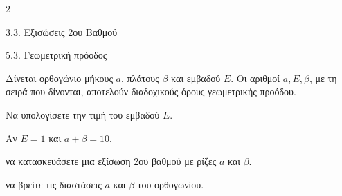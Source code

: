 \begin{ylh}{2}
    \item 3.3. Εξισώσεις 2ου Βαθμού
    \item 5.3. Γεωμετρική πρόοδος
\end{ylh}
Δίνεται ορθογώνιο μήκους $a$, πλάτους $\beta$ και εμβαδού $E$. Οι αριθμοί $a, E, \beta$, με τη σειρά που δίνονται, αποτελούν διαδοχικούς όρους γεωμετρικής προόδου.

\begin{alist}
\item Να υπολογίσετε την τιμή του εμβαδού $E$. 
\item Αν $E = 1$ και $a + \beta = 10$,

\begin{rlist}
\item να κατασκευάσετε μια εξίσωση 2{ου} βαθμού με ρίζες $a$ και $\beta$. 
\item να βρείτε τις διαστάσεις $a$ και $\beta$ του ορθογωνίου. 
\end{rlist}
\end{alist}

